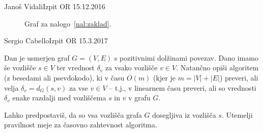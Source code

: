 \begin{naloga}{Janoš Vidali}{Izpit OR 15.12.2016}
\begin{vprasanje}
\begin{figure}
\caption{Graf za nalogo~\ref{nal:zaklad}.}
\label{fig:zaklad}
\end{figure}
\end{vprasanje}
\begin{odgovor}
\end{odgovor}
\end{naloga}


\begin{naloga}{Sergio Cabello}{Izpit OR 15.3.2017}
\begin{vprasanje}
Dan je usmerjen graf $G = (V, E)$ s pozitivnimi dolžinami povezav.
Dano imamo še vozlišče $s \in V$
ter vrednost $\delta_v$ za vsako vozlišče $v \in V$.
Natančno opiši algoritem (z besedami ali psevdokodo),
ki v času $O(m)$ (kjer je $m = |V| + |E|$) preveri,
ali velja $\delta_v = d_G(s, v)$ za vse $v \in V$
-- t.j., v linearnem času preveri,
ali so vrednosti $\delta_v$
enake razdalji med vozliščema $s$ in $v$ v grafu $G$.

Lahko predpostaviš, da so vsa vozlišča grafa $G$ dosegljiva iz vozlišča $s$.
Utemelji pravilnost meje za časovno zahtevnost algoritma.
\end{vprasanje}
\begin{odgovor}
\end{odgovor}
\end{naloga}


